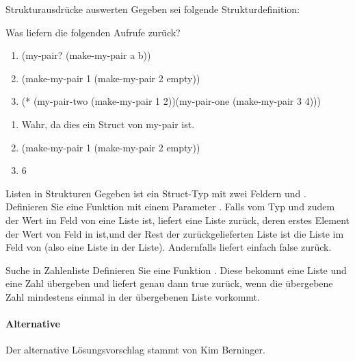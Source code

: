 \documentclass{../preamble}
\begin{document}
\begin{task}[credit = \stars{1}{3}]{Strukturausdrücke auswerten}
	Gegeben sei folgende Strukturdefinition:
	
	Was liefern die folgenden Aufrufe zurück?
	\begin{enumerate}
		\item (my-pair? (make-my-pair \grqq a\grqq{} \grqq b\grqq))
		\item (make-my-pair 1 (make-my-pair 2 \textcolor{keywordcolor}{empty}))
		\item (* (my-pair-two (make-my-pair 1 2))(my-pair-one (make-my-pair 3 4)))
	\end{enumerate}

	\begin{solution}
		\begin{enumerate}
			\item Wahr, da dies ein Struct von my-pair ist.
			\item (make-my-pair 1 (make-my-pair 2 \textcolor{keywordcolor}{empty}))
			\item 6
		\end{enumerate}
	\end{solution}
\end{task}

\begin{task}[credit = \stars{1}{3}]{Listen in Strukturen}
	Gegeben ist ein Struct-Typ  mit zwei Feldern  und . Definieren Sie eine Funktion  mit einem Parameter . Falls  vom Typ  und zudem der Wert im Feld  von  eine Liste ist, liefert  eine Liste zurück, deren erstes Element der Wert von Feld  in  ist,und der Rest der zurückgelieferten Liste ist die Liste im Feld  von  (also eine Liste in der Liste). Andernfalls liefert  einfach \textcolor{keywordcolor}{false} zurück.

	\begin{solution}
		
	\end{solution}
\end{task}

\clearpage

\begin{task}[credit = \stars{2}{3}]{Suche in Zahlenliste}
	\label{task:V9}
	Definieren Sie eine Funktion . Diese bekommt eine Liste und eine Zahl übergeben und liefert genau dann \textcolor{keywordcolor}{true} zurück, wenn die übergebene  Zahl mindestens einmal in der übergebenen Liste vorkommt.

	\begin{solution}
		

		\paragraph{Alternative}

		Der alternative Lösungsvorschlag stammt von Kim Berninger.
		
	\end{solution}
\end{task}
\end{document}
